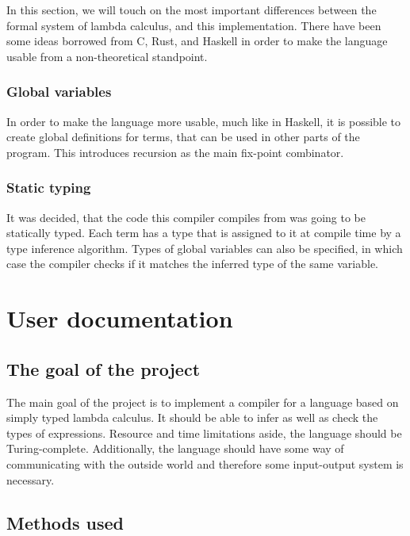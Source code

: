 \documentclass[12pt]{article}
\begin{document}
In this section, we will touch on the most important differences between the
formal system of lambda calculus, and this implementation. There have been some
ideas borrowed from C, Rust, and Haskell in order to make the language usable
from a non-theoretical standpoint.

\subsubsection{Global variables} %

In order to make the language more usable, much like in Haskell, it is possible
to create global definitions for terms, that can be used in other parts of the
program. This introduces recursion as the main fix-point combinator.

\subsubsection{Static typing} %

It was decided, that the code this compiler compiles from was going to be
statically typed. Each term has a type that is assigned to it at compile time by
a type inference algorithm. Types of global variables can also be specified, in
which case the compiler checks if it matches the inferred type of the same
variable.

\pagebreak
\section{User documentation}

\subsection{The goal of the project}

The main goal of the project is to implement a compiler for a language based on
simply typed lambda calculus. It should be able to infer as well as check the
types of expressions. Resource and time limitations aside, the language should
be Turing-complete. Additionally, the language should have some way of
communicating with the outside world and therefore some input-output system is
necessary.

\subsection{Methods used} %
\end{document}

